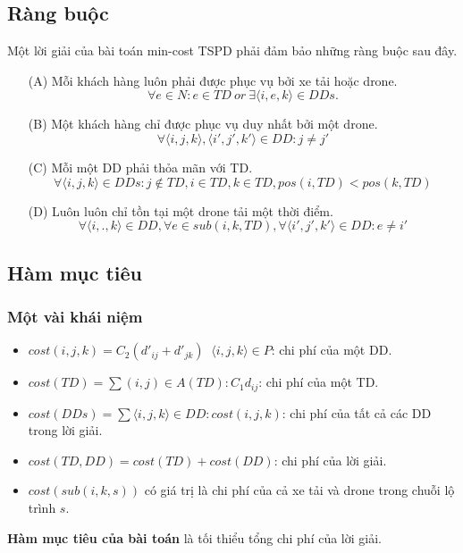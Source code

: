 \documentclass[a4paper,12pt]{report}
\begin{document}
\subsection{Ràng buộc}
Một lời giải của bài toán min-cost \ac{TSPD} phải đảm bảo những ràng buộc sau đây.
\begin{itemize}
\item[(A)]  Mỗi khách hàng luôn phải được phục vụ bởi xe tải hoặc drone. 
\begin{equation} \label{eqn:A}
\forall e \in N: e \in TD \ or \ \exists \langle i,e,k \rangle \in DDs.
\end{equation}
\item[(B)]Một khách hàng chỉ được phục vụ duy nhất bởi một drone.
\begin{equation}\label{eqn:B}
\forall \langle i,j,k\rangle,\langle i',j',k'\rangle \in DD: j \neq j'
\end{equation}
\item[(C)] Mỗi một DD phải thỏa mãn với TD.
\begin{equation}\label{eqn:C}
\forall \langle i,j,k \rangle \in DDs:j \not \in TD,i \in TD,k \in TD,pos(i,TD)<pos(k,TD)
\end{equation}
\item[(D)] Luôn luôn chỉ tồn tại một drone tải một thời điểm.
\begin{equation}\label{eqn:D}
\forall \langle i,.,k \rangle \in DD, \forall e \in sub(i,k,TD), \forall \langle i',j',k'\rangle \in DD: e \neq i'
\end{equation}
\end{itemize}
\subsection{Hàm mục tiêu}
\subsubsection{Một vài khái niệm}
\begin{itemize}
\item $cost(i,j,k)=C_2(d'_{ij}+d'_{jk}) \ $ $\langle i,j,k \rangle \in P$: chi phí của một \ac{DD}.
\item $cost(TD)=\sum(i,j) \in A(TD): C_1d_{ij}$: chi phí của một \ac{TD}.
\item $cost(DDs)=\sum \langle i,j,k \rangle \in DD: cost(i,j,k)$: chi phí của tất cả các \ac{DD} trong lời giải.
\item $cost(TD,DD)=cost(TD)+cost(DD)$: chi phí của lời giải.
\item $cost(sub(i,k,s))$ có giá trị là chi phí của cả xe tải và drone trong chuỗi lộ trình $s$.
\end{itemize}
\textbf{Hàm mục tiêu của bài toán} là tối thiểu tổng chi phí của lời giải.
\end{document}
